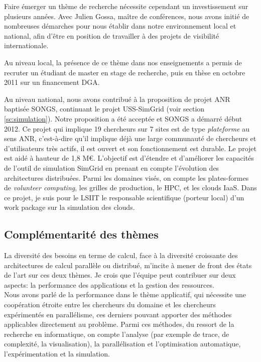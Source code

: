 \documentclass[11pt]{article}
\begin{document}
Faire émerger un thème de recherche nécessite cependant un investissement 
sur plusieurs années. Avec Julien Gossa, maître de conférences, nous avons 
initié de nombreuses démarches pour nous établir dans notre environnement 
local et national, afin d'être en position de travailler à des projets
de visibilité internationale. 

Au niveau local, la présence de ce thème dans nos enseignements a permis de 
recruter un étudiant de master en stage de recherche, puis en thèse en
octobre 2011 sur un financement DGA.

Au niveau national, nous avons contribué à la proposition de projet ANR 
baptisée SONGS, continuant le projet USS-SimGrid (voir section~%
\ref{sc:simulation}). Notre proposition a été acceptée et SONGS a démarré 
début 2012. Ce projet qui implique 19 chercheurs sur 7 sites est de type 
\emph{plateforme} au sens ANR, c'est-à-dire qu'il implique déjà une large 
communauté de chercheurs et d'utilisateurs très actifs, il est ouvert et 
son fonctionnement est durable. Le projet est aidé à hauteur de 1,8 M\euro{}.
L'objectif est d'étendre et d'améliorer les capacités de l'outil de 
simulation SimGrid en prenant en compte l'évolution des architectures 
distribuées. Parmi les domaines visés, on compte les plates-formes de 
\emph{volunteer computing}, les grilles de production, le HPC, et les 
clouds IaaS. Dans ce projet, je suis pour le LSIIT le responsable 
scientifique (porteur local) d'un work package sur la simulation des 
clouds.


\subsection*{Complémentarité des thèmes}

La diversité des besoins en terme de calcul, face à la diversité croissante des
architectures de calcul parallèle ou distribué, m'incite à mener de front des 
états de l'art sur ces deux thèmes. Je crois que l'équipe peut contribuer sur 
deux aspects: la performance des applications et la gestion des ressources.\\

Nous avons parlé de la performance dans le thème applicatif, qui nécessite une 
coopération étroite entre les chercheurs du domaine et les chercheurs 
expérimentés en parallélisme, ces derniers pouvant apporter des méthodes 
applicables directement au problème. Parmi ces méthodes, du ressort de la 
recherche en informatique, on compte l'analyse (par exemple de trace, de 
complexité, la visualisation), la parallélisation et l'optimisation automatique, 
l'expérimentation et la simulation.\\
\end{document}
